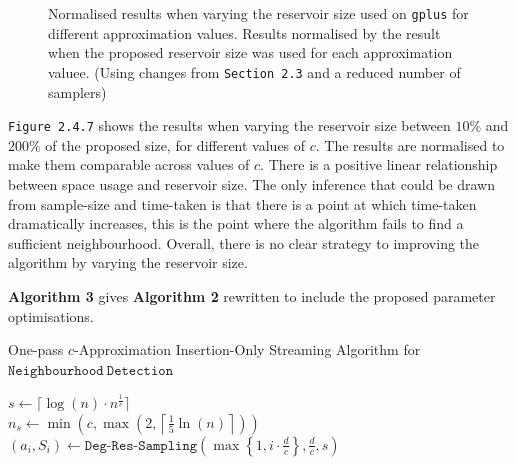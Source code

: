 \documentclass[11pt,twoside,a4paper]{report}
\begin{document}
\begin{figure}[H]
	\label{Figure 8}
	\caption{Normalised results when varying the reservoir size used on \texttt{gplus} for different approximation values. Results normalised by the result when the proposed reservoir size was used for each approximation valuee. (Using changes from \texttt{Section 2.3} and a reduced number of samplers)}
\end{figure}

\par \texttt{Figure 2.4.7} shows the results when varying the reservoir size between $10\%$ and $200\%$ of the proposed size, for different values of $c$. The results are normalised to make them comparable across values of $c$. There is a positive linear relationship between space usage and reservoir size. The only inference that could be drawn from sample-size and time-taken is that there is a point at which time-taken dramatically increases, this is the point where the algorithm fails to find a sufficient neighbourhood. Overall, there is no clear strategy to improving the algorithm by varying the reservoir size.

\par \textbf{Algorithm 3} gives \textbf{Algorithm 2} rewritten to include the proposed parameter optimisations.
\begin{algorithm}
	\caption{One-pass $c$-Approximation Insertion-Only Streaming Algorithm for $\mathtt{Neighbourhood\ Detection}$}
	$s\leftarrow\lceil\log(n)\cdot n^{\frac1c}\rceil$\\
	$n_s\leftarrow\min\left(c,\max\left(2,\left\lceil\frac15\ln(n)\right\rceil\right)\right)$\\
	 {
		$(a_i,S_i)\leftarrow\mathtt{Deg}\mbox{-}\mathtt{Res}\mbox{-}\mathtt{Sampling}\left(\max\left\{1,i\cdot\frac{d}{c}\right\},\frac{d}c,s\right)$
	}
\end{algorithm}
\end{document}
